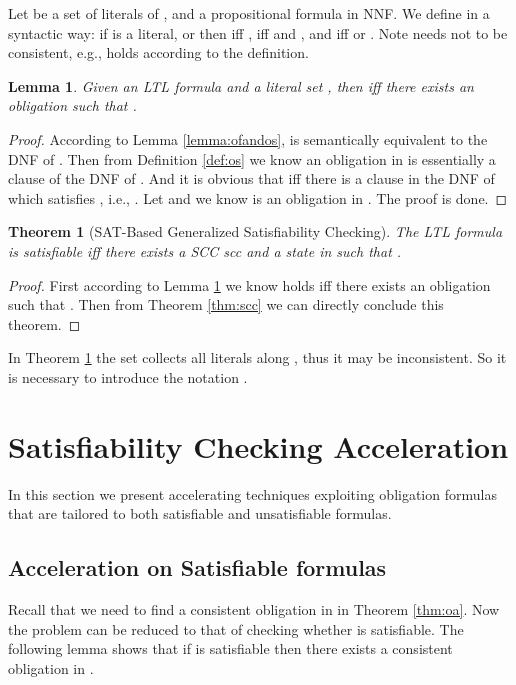 \documentclass[conference]{IEEEtran}
\newtheorem{lemma}{Lemma}
\newtheorem{theorem}{Theorem}
\newtheorem{proof}{IEEEproof}
\begin{document}
Let  be a set of literals of , and  a
propositional formula in NNF. We define  in
a syntactic way: if  is a literal,  or  then 
iff ,  iff
 and , and
 iff  or
. Note  needs not to be
consistent, e.g.,  holds according to the definition.


\begin{lemma}\label{lem:reduction_2}
  Given an LTL formula  and a literal set , then  iff there exists 
  an obligation  such that .
\end{lemma}
\begin{proof}
   According to Lemma \ref{lemma:ofandos},  is semantically equivalent to the DNF of . 
   Then from Definition \ref{def:os} we know an obligation in  is essentially a clause of the DNF of . 
   And it is obvious that  iff there is a clause  in the DNF of  which 
   satisfies , i.e., . Let 
   and we know  is an obligation in . The proof is done.
   
\end{proof}




\begin{theorem}[SAT-Based Generalized Satisfiability Checking]\label{thm:satscc}
  The LTL formula  is satisfiable iff there exists a SCC scc and a state  
  in  such that .
\end{theorem}
\begin{proof}
  First according to Lemma \ref{lem:reduction_2} we know  holds iff 
  there exists an obligation  such that . Then from  
  Theorem \ref{thm:scc} we can directly conclude this theorem.
\end{proof}

In Theorem \ref{thm:satscc} the set  collects all literals along , thus it may 
be inconsistent. So it is necessary to introduce the notation .
  
\section{Satisfiability Checking Acceleration}\label{sec:ofa}

In this section we present accelerating techniques exploiting
obligation formulas that are tailored to both satisfiable and
unsatisfiable formulas.

\subsection{Acceleration on Satisfiable formulas }
Recall that we need to find a consistent obligation in  in Theorem \ref{thm:oa}. 
Now the problem can be reduced to that of  
checking whether  is satisfiable. The following lemma shows that if  is 
satisfiable then there exists a consistent obligation in . 
\end{document}
